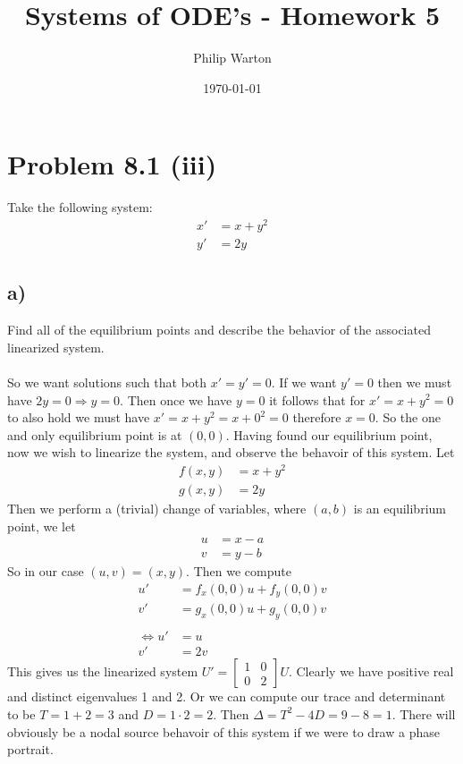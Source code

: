 \documentclass{article}
\theoremstyle{definition}
\begin{document}
\title{Systems of ODE's - Homework 5}
\author{Philip Warton}
\date{\today}
\maketitle
\section*{Problem 8.1 (iii)}
Take the following system:
\begin{align*}
    x'&=x+y^2\\y'&=2y
\end{align*}
\subsection*{a)}
Find all of the equilibrium points and describe the behavior of the associated linearized system.\\\\
So we want solutions such that both $x' = y' = 0$.
If we want $y' = 0$ then we must have $2y = 0 \Longrightarrow y = 0$.
Then once we have $y=0$ it follows that for $x' = x + y^2 = 0$ to also 
hold we must have $x' = x + y^2 = x + 0^2 = 0$ therefore $x = 0$.
So the one and only equilibrium point is at $(0,0)$. Having found our equilibrium
point, now we wish to linearize the system, and observe the behavoir of this system.
Let
\begin{align*}
    f(x,y)&=x+y^2\\g(x,y)&=2y
\end{align*}
Then we perform a (trivial) change of variables, where 
$(a,b)$ is an equilibrium point, we let
\begin{align*}
    u&=x-a\\v&=y-b
\end{align*}
So in our case $(u,v) = (x,y)$. Then we compute
\begin{align*}
    u'&=f_x(0,0)u+f_y(0,0)v\\
    v'&=g_x(0,0)u+g_y(0,0)v\\\\
    \Longleftrightarrow
    u'&=u\\
    v'&=2v
\end{align*}
This gives us the linearized system $U' = \begin{bmatrix}
    1&0\\0&2
\end{bmatrix}U$. Clearly we have positive real and distinct eigenvalues 1 and 2.
Or we can compute our trace and determinant to be $T = 1 + 2 = 3$ and $D = 1 \cdot 2 = 2$.
Then $\Delta = T^2 - 4D = 9 - 8 = 1$. There will obviously be a nodal source behavoir
of this system if we were to draw a phase portrait.
\end{document}
